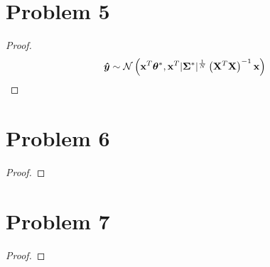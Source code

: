 \documentclass{article}
\begin{document}
\section*{Problem 5}
    \begin{proof}
        $$\vb*{\hat{y}} \sim \mathcal{N}\left(\vb{x}^T \bm{\theta}^*,\vb{x}^T |\bm{\Sigma}^*|^{\frac{1}{N}}\left(\vb{X}^T\vb{X}\right)^{-1} \vb{x} \right)$$
    \end{proof}

\section*{Problem 6}
    \begin{proof}
        
    \end{proof}

\section*{Problem 7}
    \begin{proof}
        
    \end{proof}
\end{document}
